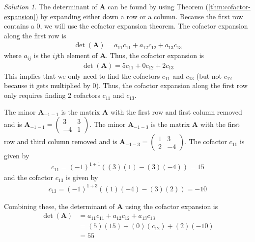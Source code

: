 \documentclass[
]{book}
\theoremstyle{definition}
\theoremstyle{definition}
\theoremstyle{definition}
\theoremstyle{remark}
\newtheorem*{solution}{Solution}
\begin{document}
\begin{solution}

The determinant of \(\mathbf{A}\) can be found by using Theorem (\ref{thm:cofactor-expansion}) by expanding either down a row or a column. Because the first row contains a 0, we will use the cofactor expansion theorem. The cofactor expansion along the first row is
\[
\begin{aligned}
\det(\mathbf{A}) = a_{11} c_{11} + a_{12} c_{12} + a_{13} c_{13}
\end{aligned}
\]
where \(a_{ij}\) is the \(ij\)th element of \(\mathbf{A}\). Thus, the cofactor expansion is
\[
\begin{aligned}
\det(\mathbf{A}) = 5 c_{11} + 0 c_{12} + 2 c_{13}
\end{aligned}
\]
This implies that we only need to find the cofactors \(c_{11}\) and \(c_{13}\) (but not \(c_{12}\) because it gets multiplied by 0). Thus, the cofactor expansion along the first row only requires finding 2 cofactors \(c_{11}\) and \(c_{13}\).

The minor \(\mathbf{A}_{-1-1}\) is the matrix \(\mathbf{A}\) with the first row and first column removed and is \(\mathbf{A}_{-1-1} = \begin{pmatrix} 3 & 3 \\ -4 & 1 \end{pmatrix}\). The minor \(\mathbf{A}_{-1-3}\) is the matrix \(\mathbf{A}\) with the first row and third column removed and is \(\mathbf{A}_{-1-3} = \begin{pmatrix} 1 & 3 \\ 2 & -4 \end{pmatrix}\). The cofactor \(c_{11}\) is given by
\[
\begin{aligned}
c_{11} = (-1)^{1+1}((3)(1) - (3) (-4)) = 15
\end{aligned}
\]
and the cofactor \(c_{13}\) is given by
\[
\begin{aligned}
c_{13} = (-1)^{1+3}((1)(-4) - (3) (2)) = -10
\end{aligned}
\]

Combining these, the determinant of \(\mathbf{A}\) using the cofactor expansion is
\[
\begin{aligned}
\det(\mathbf{A}) & = a_{11} c_{11} + a_{12} c_{12} + a_{13} c_{13} \\
& = (5) (15) + (0) (c_{12}) + (2) (-10) \\
& = 55
\end{aligned}
\]

\end{solution}
\end{document}
